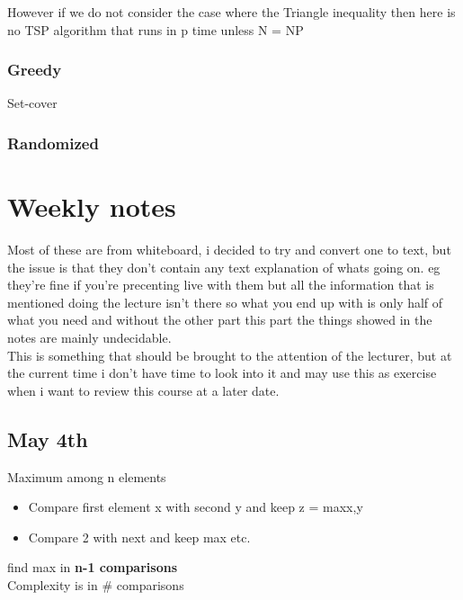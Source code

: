 \documentclass[a4paper,10pt,titlepage]{report}
\begin{document}
However if we do not consider the case where the Triangle inequality then here is no TSP algorithm that runs in p time unless N = NP\\


\subsection{Greedy}

Set-cover

\subsection{Randomized}










\newpage
\chapter{Weekly notes}
Most of these are from whiteboard, i decided to try and convert one to text, but the issue is that they don't contain any text explanation of whats going on. eg they're fine if you're precenting live with them but all the information that is mentioned doing the lecture isn't there so what you end up with is only half of what you need and without the other part this part the things showed in the notes are mainly undecidable.\\

This is something that should be brought to the attention of the lecturer, but at the current time i don't have time to look into it and may use this as exercise when i want to review this course at a later date.\\
\newpage
\section{May 4th}
Maximum among n elements\\
\begin{itemize}
\item Compare first element x with second y and keep z = max{x,y}
\item Compare 2 with next and keep max etc.
\end{itemize}
find max in \textbf{n-1 comparisons}\\

Complexity is in \# comparisons\\
\end{document}
